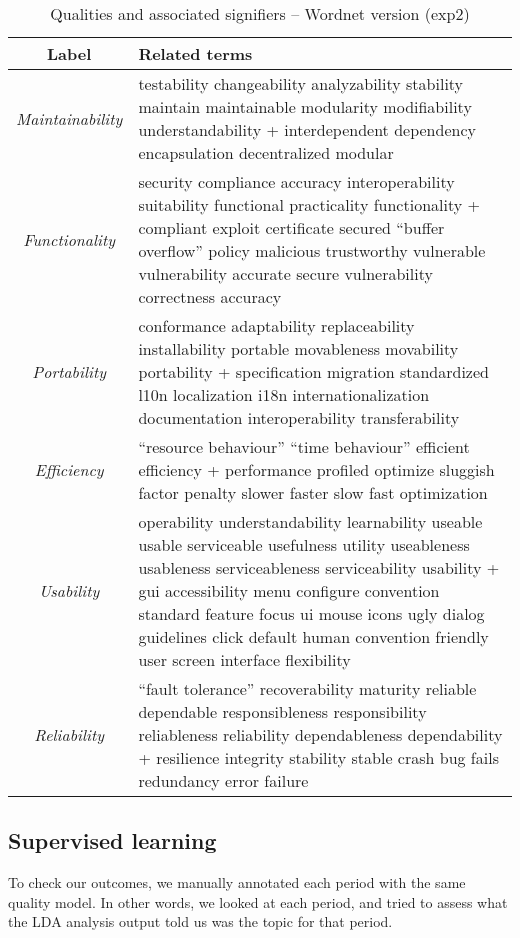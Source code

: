 \documentclass[10pt, conference, compsocconf]{IEEEtran}
\begin{document}
\begin{table*}[h]
	\caption{Qualities and associated signifiers – Wordnet version (\textsf{exp2})}
	\centering
	\label{tbl:wnsig}
\begin{tabular}{c|p{9cm}}
\toprule
\textbf{Label} & \textbf{Related terms} \\
\midrule
\emph{Maintainability} &
testability changeability analyzability stability maintain maintainable modularity modifiability understandability + interdependent dependency encapsulation decentralized modular\\ \hline
\emph{Functionality} &
security compliance accuracy interoperability suitability functional practicality functionality + compliant exploit certificate secured “buffer overflow” policy malicious trustworthy vulnerable vulnerability accurate secure vulnerability correctness accuracy\\ \hline
\emph{Portability} &
conformance adaptability replaceability installability portable movableness movability portability + specification migration standardized l10n localization i18n internationalization documentation interoperability transferability\\ \hline
\emph{Efficiency} &
“resource behaviour” “time behaviour” efficient efficiency + performance profiled optimize sluggish factor penalty slower faster slow fast optimization\\ \hline
\emph{Usability} &
operability understandability learnability useable usable serviceable usefulness utility useableness usableness serviceableness serviceability usability + gui accessibility menu configure convention standard feature focus ui mouse icons ugly dialog guidelines click default human convention friendly user screen interface flexibility\\ \hline
\emph{Reliability} &
“fault tolerance” recoverability maturity reliable dependable responsibleness responsibility reliableness reliability dependableness dependability + resilience integrity stability stable crash bug fails redundancy error failure\\ 
\bottomrule
\end{tabular}
\end{table*}

\subsection{Supervised learning}
To check our outcomes, we manually annotated each period with the same quality model. In other words, we looked at each period, and tried to assess what the LDA analysis output told us was the topic for that period.
\end{document}
